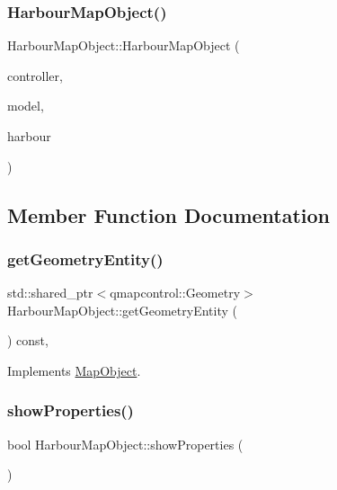 \subsubsection{\texorpdfstring{HarbourMapObject()}{HarbourMapObject()}}
{\footnotesize\ttfamily Harbour\+Map\+Object\+::\+Harbour\+Map\+Object (\begin{DoxyParamCaption}\item[{\mbox{\hyperlink{class_map_objects_controller}{Map\+Objects\+Controller}} $\ast$}]{controller,  }\item[{\mbox{\hyperlink{class_displace_model}{Displace\+Model}} $\ast$}]{model,  }\item[{\mbox{\hyperlink{class_harbour_data}{Harbour\+Data}} $\ast$}]{harbour }\end{DoxyParamCaption})}



\subsection{Member Function Documentation}
\mbox{\label{class_harbour_map_object_aa0429983795942fbf7143c081d679e0a}} 
\subsubsection{\texorpdfstring{getGeometryEntity()}{getGeometryEntity()}}
{\footnotesize\ttfamily std\+::shared\+\_\+ptr$<$qmapcontrol\+::\+Geometry$>$ Harbour\+Map\+Object\+::get\+Geometry\+Entity (\begin{DoxyParamCaption}{ }\end{DoxyParamCaption}) const\hspace{0.3cm}{\ttfamily [inline]}, {\ttfamily [virtual]}}



Implements \mbox{\hyperlink{class_map_object_a82e055e41c862ec8d80d5bfb137b3253}{Map\+Object}}.

\mbox{\label{class_harbour_map_object_a65c4f99a5a68bd4dc7dda0b49b18adac}} 
\subsubsection{\texorpdfstring{showProperties()}{showProperties()}}
{\footnotesize\ttfamily bool Harbour\+Map\+Object\+::show\+Properties (\begin{DoxyParamCaption}{ }\end{DoxyParamCaption})\hspace{0.3cm}{\ttfamily [virtual]}}



